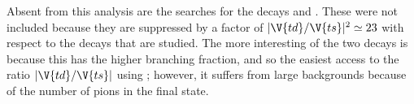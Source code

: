 Absent from this analysis are the searches for the decays \decay{\Bp}{\Kp\Km\pip\mumu}
and \decay{\Bp}{\pipi\pim\mumu}.
These were not included because they are suppressed by a factor of $|\V{td}/\V{ts}|^2\simeq23$ with
respect to the decays that are studied.
The more interesting of the two decays is \decay{\Bp}{\pipi\pim\mumu} because this has the higher
branching fraction, and so the easiest access to the ratio $|\V{td}/\V{ts}|$ using \btokpipimumu;
however, it suffers from large backgrounds because of the number of pions in the final state.







